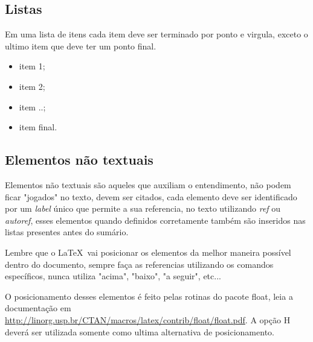 


\subsection{Listas}

Em uma lista de itens cada item deve ser terminado por ponto e virgula, exceto o ultimo item que deve ter um ponto final.

\begin{itemize}
\item item 1;
\item item 2;
\item item ..;
\item item final.
\end{itemize}

\subsection{Elementos não textuais}

Elementos não textuais são aqueles que auxiliam o entendimento, não podem ficar "jogados" no texto, devem ser citados, cada elemento deve ser identificado por um \emph{label} único que permite a sua referencia, no texto utilizando \emph{ref} ou \emph{autoref}, esses elementos quando definidos corretamente também são inseridos nas listas presentes antes do sumário.

Lembre que o \LaTeX \  vai posicionar os elementos  da melhor maneira possível dentro do documento, sempre faça as referencias utilizando os comandos específicos, nunca utiliza "acima", "baixo", "a seguir", etc...

O posicionamento desses elementos é feito pelas rotinas do pacote float, leia a documentação em  \url{http://linorg.usp.br/CTAN/macros/latex/contrib/float/float.pdf}. A opção H deverá ser utilizada somente como ultima alternativa de posicionamento.











